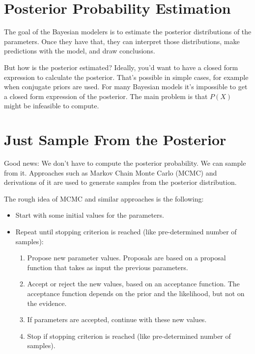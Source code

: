 \documentclass[
  10pt,
]{scrbook}
\providecommand{\tightlist}{%
  \setlength{\itemsep}{0pt}\setlength{\parskip}{0pt}}
\begin{document}
\hypertarget{posterior-probability-estimation}{%
\section{Posterior Probability Estimation}\label{posterior-probability-estimation}}

The goal of the Bayesian modelers is to estimate the posterior distributions of the parameters.
Once they have that, they can interpret those distributions, make predictions with the model, and draw conclusions.

But how is the posterior estimated?
Ideally, you'd want to have a closed form expression to calculate the posterior.
That's possible in simple cases, for example when conjugate priors are used.
For many Bayesian models it's impossible to get a closed form expression of the posterior.
The main problem is that \(P(X)\) might be infeasible to compute.

\hypertarget{just-sample-from-the-posterior}{%
\section{Just Sample From the Posterior}\label{just-sample-from-the-posterior}}

Good news: We don't have to compute the posterior probability.
We can sample from it.
Approaches such as Markov Chain Monte Carlo (MCMC) and derivations of it are used to generate samples from the posterior distribution.

The rough idea of MCMC and similar approaches is the following:

\begin{itemize}
\tightlist
\item
  Start with some initial values for the parameters.
\item
  Repeat until stopping criterion is reached (like pre-determined number of samples):

  \begin{enumerate}
  \def\labelenumi{\arabic{enumi}.}
  \tightlist
  \item
    Propose new parameter values. Proposals are based on a proposal function that takes as input the previous parameters.
  \item
    Accept or reject the new values, based on an acceptance function. The acceptance function depends on the prior and the likelihood, but not on the evidence.
  \item
    If parameters are accepted, continue with these new values.
  \item
    Stop if stopping criterion is reached (like pre-determined number of samples).
  \end{enumerate}
\end{itemize}
\end{document}
